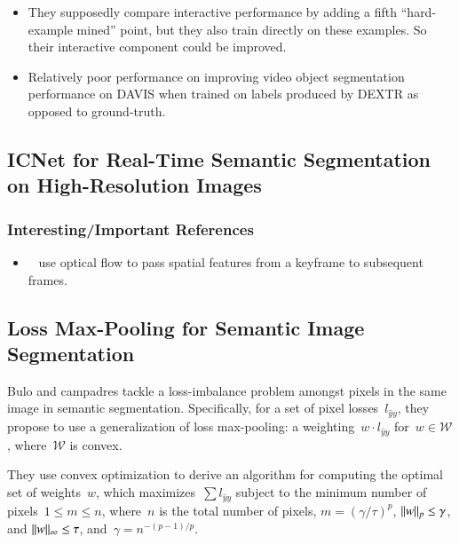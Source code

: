 \documentclass[a4paper, 12pt]{article}
\DeclarePairedDelimiter\norm{\lVert}{\rVert}%
\begin{document}
\begin{itemize}
        \item They supposedly compare interactive performance by adding a fifth
                ``hard-example mined'' point, but they also train directly on
                these examples.
                So their interactive component could be improved.

        \item Relatively poor performance on improving video object
                segmentation performance on DAVIS when trained on labels
                produced by DEXTR as opposed to ground-truth.
\end{itemize}


\subsection{ICNet for Real-Time Semantic Segmentation on High-Resolution
            Images~\cite{zhao2017icnet}}

\subsubsection{Interesting/Important References}

\begin{itemize}
        \item~\cite{zhu17dff} use optical flow to pass spatial features from a
                keyframe to subsequent frames.
\end{itemize}


\subsection{Loss Max-Pooling for Semantic Image Segmentation~\cite{bulo2017loss}}

Bulo and campadres tackle a loss-imbalance problem amongst pixels in the same
image in semantic segmentation. Specifically, for a set of pixel
losses~$l_{\hat{y} y}$, they propose to use a generalization of loss
max-pooling: a weighting~$w \cdot l_{\hat{y} y}$ for~$w \in \mathcal{W}$,
where~$\mathcal{W}$ is convex.

They use convex optimization to derive an algorithm for computing the optimal
set of weights~$w$, which maximizes~$\sum l_{\hat{y} y}$ subject to the minimum
number of pixels~$1 \leq m \leq n$, where~$n$ is the total number of pixels,
$m = {(\gamma / \tau)}^p$, $\norm{w}_p \leq \gamma$, and
$\norm{w}_\infty \leq \tau$, and~$\gamma = n^{-(p - 1)/p}$.
\end{document}
